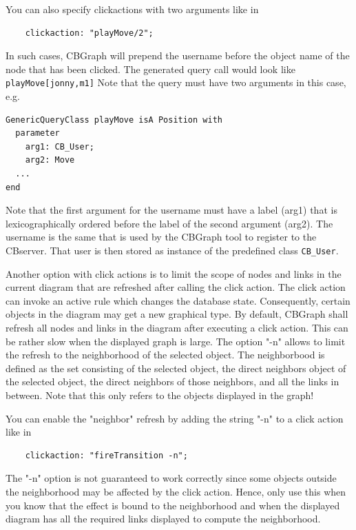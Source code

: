 \vspace{0.3cm}
You can also specify clickactions with two arguments like in
{\small
\begin{verbatim}
    clickaction: "playMove/2";
\end{verbatim}
}

In such cases, CBGraph will prepend the username before the object name of the node
that has been clicked. The generated query call would look like {\tt playMove[jonny,m1]}
Note that the query must have two arguments in this case, e.g.

{\small
\begin{verbatim}
GenericQueryClass playMove isA Position with
  parameter
    arg1: CB_User;
    arg2: Move
  ...
end
\end{verbatim}
}

Note that the first argument for the username must have a label (arg1) that is lexicographically
ordered before the label of the second argument (arg2). The username is the same that is used
by the CBGraph tool to register to the CBserver. That user is then stored as instance of the
predefined class {\tt CB\_User}.


\vspace{0.3cm}
Another option with click actions is to limit the scope of nodes and links in the current diagram
that are refreshed after calling the click action. The click action can invoke an
active rule which changes the database state. Consequently, certain objects in the diagram
may get a new graphical type. By default, CBGraph shall refresh all nodes and links in the diagram
after executing a click action. This can be rather slow when the displayed graph is large.
The option "-n" allows to limit the refresh to the neighborhood of the selected object.
The neighborbood is defined as the set consisting of the selected object, the direct neighbors object of the
selected object, the direct neighbors of those neighbors, and all the links in between. 
Note that this only refers to the objects displayed in the graph!

You can enable the "neighbor" refresh by adding the string "-n" to a click action like in

{\small
\begin{verbatim}
    clickaction: "fireTransition -n";
\end{verbatim}
}

The "-n" option is not guaranteed to work correctly since some objects outside the neighborhood
may be affected by the click action. Hence, only use this when you know that the effect is
bound to the neighborhood and when the displayed diagram has all the required links displayed
to compute the neighborhood. 

